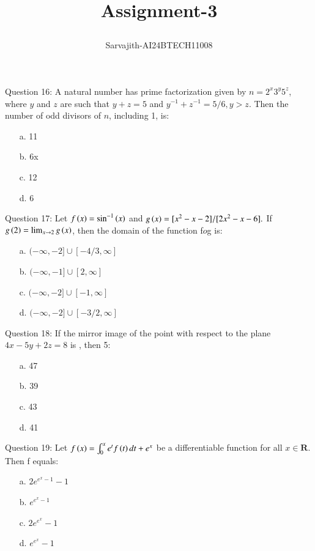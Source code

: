 \documentclass[journal,12pt,twocolumn]{IEEEtran}
\title{Assignment-3

}
\author{Sarvajith-AI24BTECH11008}
\theoremstyle{remark}
\begin{document}
\maketitle


Question 16: A natural number has prime factorization given by $n = 2^x3^y5^z$, where $y$ and $z$ are such that $y + z = 5$ and $y^{-1} + z^{-1} = 5/6, y>z$. Then the number of odd divisors of $n$, including 1, is:
\begin{multicols}{2}
\begin{enumerate}
    \item [a.] 11
    \item [b.] 6x
	    \columnbreak
    \item [c.] 12
    \item [d.] 6   
\end{enumerate}
\end{multicols}
Question 17: Let $f\left(x\right) = \sin ^{-1} \left(x\right)$ and $g\left(x\right) = [x^2-x-2]/[2x^2-x-6].$ If $g\left(2\right) =\lim_{x\rightarrow2}g\left(x\right)$, then the domain of the function f$o$g is:
\begin{multicols}{2}
\begin{enumerate}
    \item [a.] $(-\infty,-2]\cup[-4/3,\infty]$
    \item [b.] $(-\infty,-1]\cup[2,\infty]$
	    \columnbreak
    \item [c.] $(-\infty,-2]\cup[-1,\infty]$
    \item [d.] $(-\infty,-2]\cup[-3/2,\infty]$
\end{enumerate}
\end{multicols}
Question 18: If the mirror image of the point  with respect to the plane $4x-5y+2z=8$ is \brak{\alpha,\beta,\gamma}, then
5\brak{\alpha+\beta+\gamma}:
\begin{multicols}{2}
\begin{enumerate}
    \item [a.] 47
    \item [b.] 39
	    \columnbreak
    \item [c.] 43
    \item [d.] 41  
\end{enumerate}
\end{multicols}
Question 19: Let $f\left(x\right)=\int_0 ^x e^t f\left(t\right)dt + e^x $ be a differentiable function for all $x\in \mathbf{R}$. Then f equals:
\begin{multicols}{2}
\begin{enumerate}
    \item [a.] $2e^{e^x-1}-1$
    \item [b.] $e^{e^x-1}$
	    \columnbreak
    \item [c.] $2e^{e^x}-1$
    \item [d.] $e^{e^x}-1$
\end{enumerate}
\end{multicols}
\end{document}
